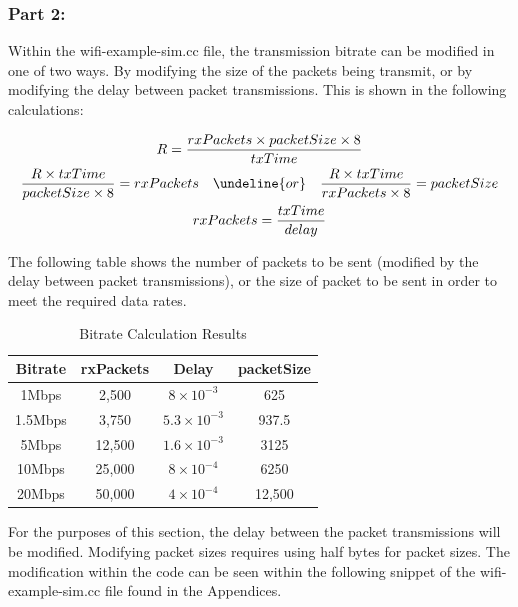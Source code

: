 \subsubsection{Part 2:}

Within the wifi-example-sim.cc file, the transmission bitrate can be modified in
one of two ways. By modifying the size of the packets being transmit, or by
modifying the delay between packet transmissions. This is shown in the following
calculations:

\begin{gather*}
	R=\frac{rxPackets\times packetSize \times 8}{txTime} \\
	\begin{align*}
		\frac{R\times txTime}{packetSize \times 8} &= rxPackets &
		\undeline{or}& & \frac{R \times txTime}{rxPackets
	\times 8} &= packetSize \\
	\end{align*} \\
	rxPackets=\frac{txTime}{delay}
\end{gather*}

The following table shows the number of packets to be sent (modified by the
delay between packet transmissions), or the size of packet to be sent in order
to meet the required data rates.

\begin{table}[H]
	\centering
	\caption{Bitrate Calculation Results}
	\label{tab:brcalc}
	\begin{tabular}{|c|c|c|c|}
	\hline
	Bitrate & rxPackets & Delay & packetSize \\
	\hline
	1Mbps & 2,500 & $8\times 10^{-3}$ & 625 \\
	1.5Mbps & 3,750 & $5.3\times 10^{-3}$ & 937.5 \\
	5Mbps & 12,500 & $1.6\times 10^{-3}$ & 3125 \\
	10Mbps & 25,000 & $8\times 10^{-4}$ & 6250 \\
	20Mbps & 50,000 & $4\times 10^{-4}$ & 12,500 \\
	\hline
	\end{tabular}
\end{table}

\par For the purposes of this section, the delay between the packet transmissions
will be modified. Modifying packet sizes requires using half bytes for packet
sizes. The modification within the code can be seen within the following
snippet of the wifi-example-sim.cc file found in the Appendices.

